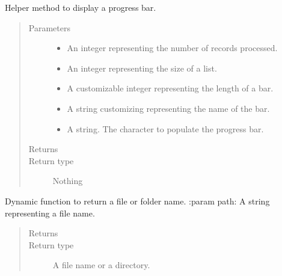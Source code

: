 \documentclass[letterpaper,10pt,english]{sphinxmanual}
\begin{document}
\begin{fulllineitems}
\label{\detokenize{index:ListManagement.utility.general.myprogressbar}}
Helper method to display a progress bar.
\begin{quote}\begin{description}
\item[{Parameters}] \leavevmode\begin{itemize}
\item {} 
 \textendash{} An integer representing the number of records processed.

\item {} 
 \textendash{} An integer representing the size of a list.

\item {} 
 \textendash{} A customizable integer representing the length of a bar.

\item {} 
 \textendash{} A string customizing representing the name of the bar.

\item {} 
 \textendash{} A string. The character to populate the progress bar.

\end{itemize}

\item[{Returns}] \leavevmode


\item[{Return type}] \leavevmode
Nothing

\end{description}\end{quote}

\end{fulllineitems}


\begin{fulllineitems}
\label{\detokenize{index:ListManagement.utility.general.path_leaf}}
Dynamic function to return a file or folder name.
:param path: A string representing a file name.
\begin{quote}\begin{description}
\item[{Returns}] \leavevmode


\item[{Return type}] \leavevmode
A file name or a directory.

\end{description}\end{quote}

\end{fulllineitems}
\end{document}
